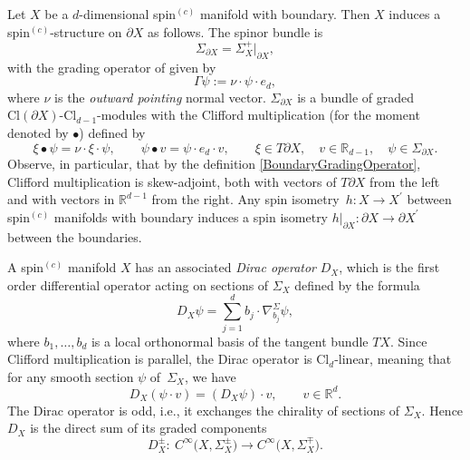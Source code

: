 \documentclass[10pt,a4paper]{amsart}
\numberwithin{equation}{section}
\newcommand{\R}{\mathbb{R}}
\newcommand{\Cl}{\mathrm{Cl}}
\begin{document}
\begin{Construction}
Let $X$ be a $d$-dimensional spin$^{(c)}$ manifold with boundary.
Then $X$ induces a spin$^{(c)}$-structure on $\partial X$ as follows.
The spinor bundle is
\begin{equation*}
 \Sigma_{\partial X} = \Sigma_X^+|_{\partial X},
\end{equation*}
with the grading operator of given by
\begin{equation} \label{BoundaryGradingOperator}
\Gamma\psi := \nu \cdot \psi \cdot e_d,
\end{equation}
where $\nu$ is the \emph{outward pointing} normal vector.
$\Sigma_{\partial X}$ is a bundle of graded $\Cl(\partial X)$-$\Cl_{d-1}$-modules with the Clifford multiplication (for the moment denoted by $\bullet$) defined by
\begin{equation*}
 \xi \bullet \psi = \nu \cdot \xi \cdot \psi, \qquad \psi \bullet v = \psi \cdot e_d \cdot v, \qquad \xi \in T\partial X, \quad v \in \R_{d-1},\quad \psi \in \Sigma_{\partial X}.
\end{equation*}
Observe, in particular, that by the definition \eqref{BoundaryGradingOperator}, Clifford multiplication is skew-adjoint, both with vectors of $T\partial X$ from the left and with vectors in $\R^{d-1}$ from the right.
Any spin isometry~${h\colon X \to X^\prime}$ between spin$^{(c)}$ manifolds with boundary induces a spin isometry $h|_{\partial X}\colon \partial X \to \partial X^\prime$ between the boundaries.
\end{Construction}




A spin$^{(c)}$ manifold $X$ has an associated \emph{Dirac operator} $D_X$, which is the first order differential operator acting on sections of $\Sigma_X$ defined by the formula
\begin{equation*}%
 D_X \psi = \sum_{j=1}^d b_j \cdot \nabla^\Sigma_{b_j} \psi,
\end{equation*}
where $b_1, \dots, b_d$ is a local orthonormal basis of the tangent bundle $TX$.
Since Clifford multiplication is parallel, the Dirac operator is $\Cl_d$-linear, meaning that for any smooth section $\psi$ of~$\Sigma_X$, we have
\begin{equation*}
 D_X(\psi \cdot v) = (D_X \psi) \cdot v, \qquad v \in \R^d.
\end{equation*}
The Dirac operator is odd, i.e., it exchanges the chirality of sections of $\Sigma_X$.
Hence $D_X$ is the direct sum of its graded components
\begin{equation*}
 D^{\pm}_X \colon\ C^\infty\big(X, \Sigma^\pm_X\big) \longrightarrow C^\infty\big(X, \Sigma^\mp_X\big).
\end{equation*}
\end{document}
